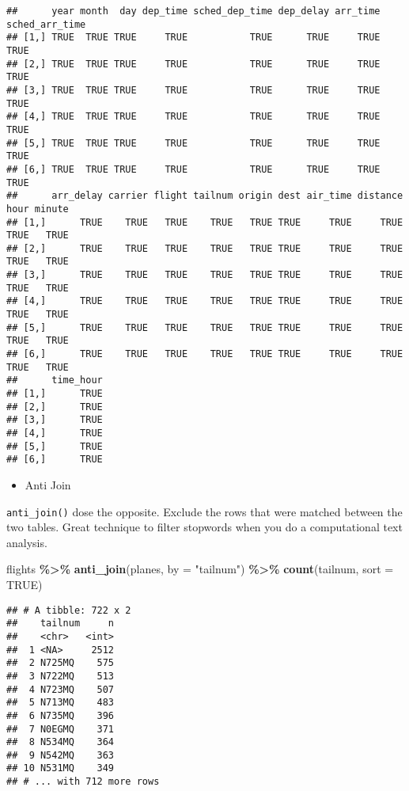 \documentclass[
]{book}
\newenvironment{Shaded}{\begin{snugshade}}{\end{snugshade}}
\newcommand{\DataTypeTok}[1]{\textcolor[rgb]{0.13,0.29,0.53}{#1}}
\newcommand{\KeywordTok}[1]{\textcolor[rgb]{0.13,0.29,0.53}{\textbf{#1}}}
\newcommand{\NormalTok}[1]{#1}
\newcommand{\OperatorTok}[1]{\textcolor[rgb]{0.81,0.36,0.00}{\textbf{#1}}}
\newcommand{\OtherTok}[1]{\textcolor[rgb]{0.56,0.35,0.01}{#1}}
\newcommand{\StringTok}[1]{\textcolor[rgb]{0.31,0.60,0.02}{#1}}
\providecommand{\tightlist}{%
  \setlength{\itemsep}{0pt}\setlength{\parskip}{0pt}}
\begin{document}
\begin{verbatim}
##      year month  day dep_time sched_dep_time dep_delay arr_time sched_arr_time
## [1,] TRUE  TRUE TRUE     TRUE           TRUE      TRUE     TRUE           TRUE
## [2,] TRUE  TRUE TRUE     TRUE           TRUE      TRUE     TRUE           TRUE
## [3,] TRUE  TRUE TRUE     TRUE           TRUE      TRUE     TRUE           TRUE
## [4,] TRUE  TRUE TRUE     TRUE           TRUE      TRUE     TRUE           TRUE
## [5,] TRUE  TRUE TRUE     TRUE           TRUE      TRUE     TRUE           TRUE
## [6,] TRUE  TRUE TRUE     TRUE           TRUE      TRUE     TRUE           TRUE
##      arr_delay carrier flight tailnum origin dest air_time distance hour minute
## [1,]      TRUE    TRUE   TRUE    TRUE   TRUE TRUE     TRUE     TRUE TRUE   TRUE
## [2,]      TRUE    TRUE   TRUE    TRUE   TRUE TRUE     TRUE     TRUE TRUE   TRUE
## [3,]      TRUE    TRUE   TRUE    TRUE   TRUE TRUE     TRUE     TRUE TRUE   TRUE
## [4,]      TRUE    TRUE   TRUE    TRUE   TRUE TRUE     TRUE     TRUE TRUE   TRUE
## [5,]      TRUE    TRUE   TRUE    TRUE   TRUE TRUE     TRUE     TRUE TRUE   TRUE
## [6,]      TRUE    TRUE   TRUE    TRUE   TRUE TRUE     TRUE     TRUE TRUE   TRUE
##      time_hour
## [1,]      TRUE
## [2,]      TRUE
## [3,]      TRUE
## [4,]      TRUE
## [5,]      TRUE
## [6,]      TRUE
\end{verbatim}

\begin{itemize}
\tightlist
\item
  Anti Join
\end{itemize}

\texttt{anti\_join()} dose the opposite. Exclude the rows that were matched between the two tables. Great technique to filter stopwords when you do a computational text analysis.

\begin{Shaded}
\begin{Highlighting}[]
\NormalTok{flights }\OperatorTok{\%\textgreater{}\%}
\StringTok{  }\KeywordTok{anti\_join}\NormalTok{(planes, }\DataTypeTok{by =} \StringTok{"tailnum"}\NormalTok{) }\OperatorTok{\%\textgreater{}\%}
\StringTok{  }\KeywordTok{count}\NormalTok{(tailnum, }\DataTypeTok{sort =} \OtherTok{TRUE}\NormalTok{)}
\end{Highlighting}
\end{Shaded}

\begin{verbatim}
## # A tibble: 722 x 2
##    tailnum     n
##    <chr>   <int>
##  1 <NA>     2512
##  2 N725MQ    575
##  3 N722MQ    513
##  4 N723MQ    507
##  5 N713MQ    483
##  6 N735MQ    396
##  7 N0EGMQ    371
##  8 N534MQ    364
##  9 N542MQ    363
## 10 N531MQ    349
## # ... with 712 more rows
\end{verbatim}
\end{document}
